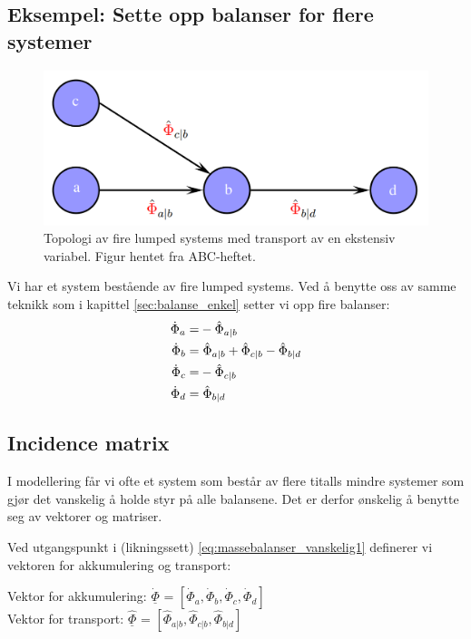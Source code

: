 \subsection{Eksempel: Sette opp balanser for flere systemer}\label{sec:flere_massebalanser}
\begin{figure}[H]
    \centering
    \includegraphics[scale=0.3]{Figures/massebalanser_flere_systemer}
    \caption{Topologi av fire lumped systems med transport av en ekstensiv variabel. Figur hentet fra ABC-heftet.}
    \label{fig:massebalanser_flersystem}
\end{figure}
Vi har et system bestående av fire lumped systems. Ved å benytte oss av samme teknikk som i kapittel \ref{sec:balanse_enkel} setter vi opp fire balanser: 
\begin{equation} 
    \begin{split}
    \label{eq:massebalanser_vanskelig1}
    \dot{\Phi}_{a} = & -\hat{\Phi}_{a|b} \\
    \dot{\Phi}_{b} = &\hspace{0.1cm} \hat{\Phi}_{a|b} + \hat{\Phi}_{c|b}-\hat{\Phi}_{b|d}\\
    \dot{\Phi}_{c} = & -\hat{\Phi}_{c|b}\\
    \dot{\Phi}_{d} = & \hspace{0.1cm}\hat{\Phi}_{b|d} \end{split}
\end{equation}


\subsection{Incidence matrix}
I modellering får vi ofte et system som består av flere titalls mindre systemer som gjør det vanskelig å holde styr på alle balansene. Det er derfor ønskelig å benytte seg av vektorer og matriser. 

Ved utgangspunkt i (likningssett) \ref{eq:massebalanser_vanskelig1} definerer vi vektoren for akkumulering og transport:\\ 
\begin{center}
    Vektor for akkumulering: $\underline{\dot{\Phi}}$ =
$[\dot{\Phi}_a,\dot{\Phi}_b,\dot{\Phi}_c,\dot{\Phi}_d]$ \\
Vektor for transport:  $\underline{\hat{\Phi}}$ =
$[\hat{\Phi}_{a|b},\hat{\Phi}_{c|b},\hat{\Phi}_{b|d}]$
    
\end{center}

